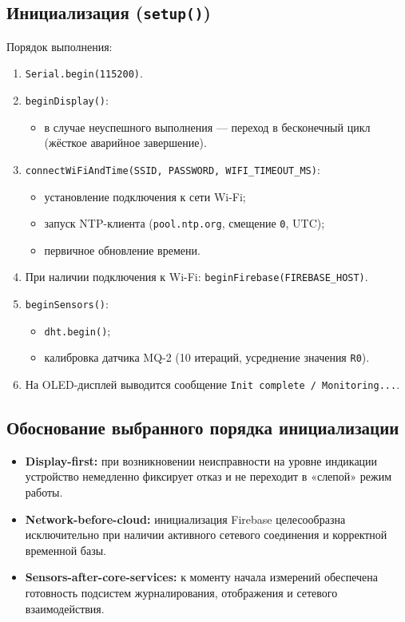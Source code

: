 \subsection{Инициализация (\texttt{setup()})}

Порядок выполнения:

\begin{enumerate}
    \item \texttt{Serial.begin(115200)}.
    \item \texttt{beginDisplay()}:
    \begin{itemize}
        \item в случае неуспешного выполнения --- переход в бесконечный цикл (жёсткое аварийное завершение).
    \end{itemize}
    \item \texttt{connectWiFiAndTime(SSID, PASSWORD, WIFI\_TIMEOUT\_MS)}:
    \begin{itemize}
        \item установление подключения к сети Wi-Fi;
        \item запуск NTP-клиента (\texttt{pool.ntp.org}, смещение \texttt{0}, UTC);
        \item первичное обновление времени.
    \end{itemize}
    \item При наличии подключения к Wi-Fi: \texttt{beginFirebase(FIREBASE\_HOST)}.
    \item \texttt{beginSensors()}:
    \begin{itemize}
        \item \texttt{dht.begin()};
        \item калибровка датчика MQ-2 (10 итераций, усреднение значения \texttt{R0}).
    \end{itemize}
    \item На OLED-дисплей выводится сообщение \texttt{Init complete / Monitoring...}.
\end{enumerate}

\subsection{Обоснование выбранного порядка инициализации}

\begin{itemize}
    \item \textbf{Display-first:} при возникновении неисправности на уровне индикации устройство немедленно фиксирует отказ и не переходит в «слепой» режим работы.
    \item \textbf{Network-before-cloud:} инициализация Firebase целесообразна исключительно при наличии активного сетевого соединения и корректной временной базы.
    \item \textbf{Sensors-after-core-services:} к моменту начала измерений обеспечена готовность подсистем журналирования, отображения и сетевого взаимодействия.
\end{itemize}

